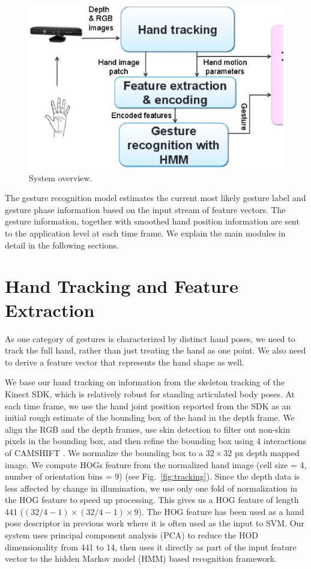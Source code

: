 \documentclass[conference]{IEEEtran}
\begin{document}
\begin{figure}[!t]
\centering
\includegraphics[width=0.8\columnwidth]{fig/system_overview.ps}
\caption{System overview.}
\label{fig:system}
\end{figure}

The gesture recognition model estimates the current most likely gesture label
and gesture phase information based on the input stream of
feature vectors. The gesture information, 
together with smoothed hand position information are sent to the application level at each time frame.
We explain the main modules in detail in the following sections.

\section{Hand Tracking and Feature Extraction}
As one category of gestures is characterized by distinct hand poses,
we need to track the full hand, rather than just treating the hand as one point. We
also need to derive a feature vector that represents the hand shape as well.

We base our hand tracking on information from the skeleton tracking of the
Kinect SDK, which is relatively robust for standing articulated body poses. At
each time frame, we use the hand joint position reported from the SDK as an
initial rough estimate of the bounding box of the hand in the depth frame.
We align the RGB and the depth frames, use skin detection to filter out
non-skin pixels in the bounding box, and then refine the bounding box using 4
interactions of CAMSHIFT \cite{bradski98}. We normalize the bounding box to a $32\times 32$ px depth
mapped image. We compute HOGs
feature from the normalized hand image (cell size =
4, number of orientation bins = 9) (see Fig.~\ref{fig:tracking}).
Since the depth data is less affected by change in illumination, we use only one
fold of normalization in the HOG feature to speed up processing.
This gives us a HOG feature of length 441 ($(32/4 - 1)\times (32/4 - 1)\times 9$). The HOG
feature has been used as a hand pose descriptor in previous work \cite{song12}
where it is often used as the input to SVM. Our system uses principal component analysis (PCA)
to reduce the HOD dimensionality from 441 to 14, then uses it directly as part
of the input feature vector to the hidden Markov model (HMM) based recognition framework.
\end{document}
